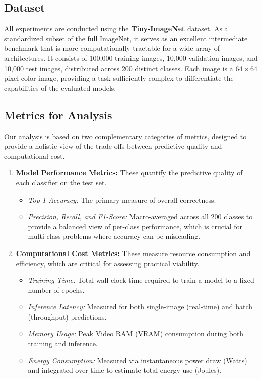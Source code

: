 \documentclass[acmsmall]{acmart}
\begin{document}
\subsection{Dataset}

All experiments are conducted using the \textbf{Tiny-ImageNet} dataset. As a standardized subset of the full ImageNet, it serves as an excellent intermediate benchmark that is more computationally tractable for a wide array of architectures. It consists of 100,000 training images, 10,000 validation images, and 10,000 test images, distributed across 200 distinct classes. Each image is a $64 \times 64$ pixel color image, providing a task sufficiently complex to differentiate the capabilities of the evaluated models.

\subsection{Metrics for Analysis}

Our analysis is based on two complementary categories of metrics, designed to provide a holistic view of the trade-offs between predictive quality and computational cost.

\begin{enumerate}
    \item \textbf{Model Performance Metrics:} These quantify the predictive quality of each classifier on the test set.
    \begin{itemize}
        \item \textit{Top-1 Accuracy:} The primary measure of overall correctness.
        \item \textit{Precision, Recall, and F1-Score:} Macro-averaged across all 200 classes to provide a balanced view of per-class performance, which is crucial for multi-class problems where accuracy can be misleading.
    \end{itemize}
    \item \textbf{Computational Cost Metrics:} These measure resource consumption and efficiency, which are critical for assessing practical viability.
    \begin{itemize}
        \item \textit{Training Time:} Total wall-clock time required to train a model to a fixed number of epochs.
        \item \textit{Inference Latency:} Measured for both single-image (real-time) and batch (throughput) predictions.
        \item \textit{Memory Usage:} Peak Video RAM (VRAM) consumption during both training and inference.
        \item \textit{Energy Consumption:} Measured via instantaneous power draw (Watts) and integrated over time to estimate total energy use (Joules).
    \end{itemize}
\end{enumerate}
\end{document}
